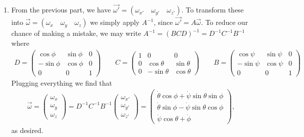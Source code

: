 \documentclass{article}
\theoremstyle{definition}
\begin{document}
\begin{enumerate}[label=(\alph*)]
	
	\item From the previous part, we have $\vec{\omega'} = (\omega_{x'} \quad \omega_{y'} \quad \omega_{z'})$. To transform these into $\vec{\omega} = (\omega_{x} \quad \omega_{y} \quad \omega_{z})$ we simply apply $A^{-1}$, since $\vec{\omega'} = A \vec{\omega}$. To reduce our chance of making a mistake, we may write $A^{-1} = (BCD)^{-1} = D^{-1}C^{-1} B^{-1}$ where
	\begin{align*}
	D = \begin{pmatrix}
	\cos\phi & \sin\phi & 0\\
	-\sin\phi & \cos\phi & 0\\
	0 &0 & 1
	\end{pmatrix} \quad\quad 
	C= \begin{pmatrix}
	1 & 0 & 0 \\
	0 & \cos\theta&\sin\theta \\
	0 & -\sin\theta  & \cos\theta
	\end{pmatrix}
	\quad\quad
	B = \begin{pmatrix}
	\cos\psi & \sin\psi & 0 \\
	-\sin\psi & \cos\psi & 0 \\
	0 & 0 & 1
	\end{pmatrix}
	\end{align*} 
	Plugging everything we find that 
	\begin{align*}
	\vec{\omega} = \begin{pmatrix}
	\omega_x \\ \omega_y \\ \omega_z 
	\end{pmatrix}
	= 
	D^{-1}C^{-1} B^{-1}
	\begin{pmatrix}
	\omega_{x'} \\
	\omega_{y'} \\
	\omega_{z'} 
	\end{pmatrix} = 
	\begin{pmatrix}
	\dot\theta \cos\phi + \dot\psi \sin\theta\sin\phi  \\ 
	\dot\theta \sin\phi - \dot\psi \sin\theta\cos\phi  \\ 
	\dot\psi \cos\theta  + \dot\phi
	\end{pmatrix},
	\end{align*}
	as desired.
	

\end{enumerate}
\end{document}
